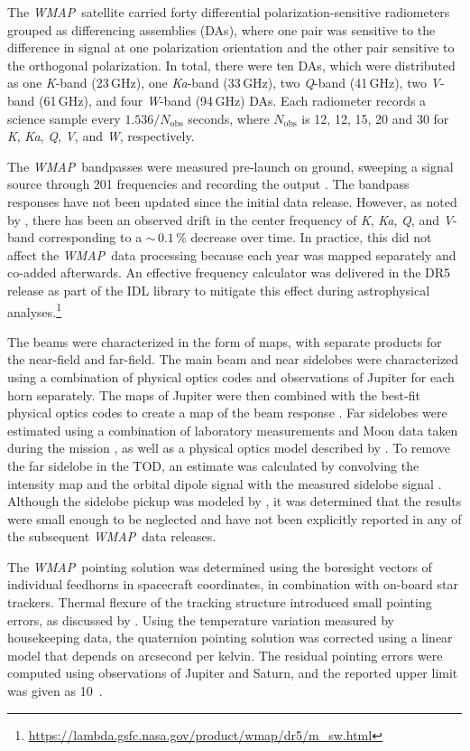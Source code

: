 \documentclass[twocolumn]{../../common/aa}
\def\WMAP{\emph{WMAP}}
\newcommand{\K}[0]{\textit K}
\newcommand{\Ka}[0]{\textit{Ka}}
\newcommand{\Q}[0]{\textit Q}
\newcommand{\V}[0]{\textit V}
\newcommand{\W}[0]{\textit W}
\begin{document}
The \WMAP\ satellite carried forty differential polarization-sensitive
radiometers grouped as differencing assemblies (DAs), where one pair
was sensitive to the difference in signal at one polarization
orientation and the other pair sensitive to the orthogonal
polarization. In total, there were ten DAs, which were distributed as
one \K-band (23\,GHz), one \Ka-band (33\,GHz), two \Q-band (41\,GHz),
two \V-band (61\,GHz), and four \W-band (94\,GHz) DAs. Each radiometer records a science sample every $1.536/N_\mathrm{obs}$ seconds, where $N_\mathrm{obs}$ is 12, 12, 15, 20 and 30 for \K, \Ka, \Q, \V, and \W, respectively.

The \WMAP\ bandpasses were measured pre-launch on ground, sweeping a signal source through 201 frequencies and recording the output \citep{jarosik2003:MAP}. The bandpass responses have not been updated since the initial data release. However, as noted by \citet{bennett2012}, there has been an observed drift in the center frequency of \K, \Ka, \Q, and \V-band corresponding to a $\sim$$\,0.1\,\%$ decrease over time. In practice, this did not affect the \WMAP\ data processing because each year was mapped separately and co-added afterwards. An effective frequency calculator was delivered in the DR5 release as part of the IDL library to mitigate this effect during astrophysical analyses.\footnote{\url{https://lambda.gsfc.nasa.gov/product/wmap/dr5/m_sw.html}}

The beams were characterized in the form of maps, with separate products for the near-field and far-field. The main beam and near sidelobes were characterized using a combination of physical optics codes and observations of Jupiter for each horn separately. The maps of Jupiter were then combined with the best-fit physical optics codes to create a map of the beam response \citep{hill2009,weiland2010,bennett2012}.
Far sidelobes were estimated using a combination of laboratory measurements and Moon data taken during the mission \citep{barnes2003}, as well as a physical optics model described by \citet{hinshaw2009}. To remove the far sidelobe  in the TOD, an estimate was calculated by convolving the intensity map and the orbital dipole signal with the measured sidelobe signal \citep{jarosik2007}. Although the sidelobe pickup was modeled by \citet{barnes2003}, it was determined that the results were small enough to be neglected and have not been explicitly reported in any of the subsequent \WMAP\ data releases.

The \WMAP\ pointing solution was determined using the boresight vectors of individual feedhorns in spacecraft coordinates, in combination with on-board star trackers. Thermal flexure of the tracking structure introduced small pointing errors, as discussed by \citet{jarosik2007}. Using the temperature variation measured by housekeeping data, the quaternion pointing solution was corrected using a linear model that depends on arcsecond per kelvin. The residual pointing errors were computed using observations of Jupiter and Saturn, and the reported upper limit was given as 10\arcsec\ \citep{bennett2012,wmapexsupp}.
\end{document}
